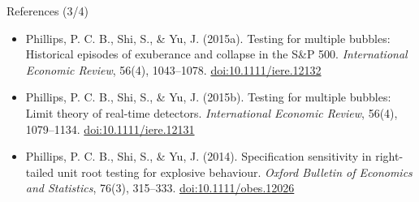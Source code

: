 \begin{frame}{References (3/4)}
\begin{itemize}
    \item Phillips, P. C. B., Shi, S., \& Yu, J. (2015a). Testing for multiple bubbles: Historical episodes of exuberance and collapse in the S\&P 500. \textit{International Economic Review}, 56(4), 1043--1078. \href{https://doi.org/10.1111/iere.12132}{doi:10.1111/iere.12132}
    \item Phillips, P. C. B., Shi, S., \& Yu, J. (2015b). Testing for multiple bubbles: Limit theory of real-time detectors. \textit{International Economic Review}, 56(4), 1079--1134. \href{https://doi.org/10.1111/iere.12131}{doi:10.1111/iere.12131}
    \item Phillips, P. C. B., Shi, S., \& Yu, J. (2014). Specification sensitivity in right-tailed unit root testing for explosive behaviour. \textit{Oxford Bulletin of Economics and Statistics}, 76(3), 315--333. \href{https://doi.org/10.1111/obes.12026}{doi:10.1111/obes.12026}
\end{itemize}
\end{frame}

